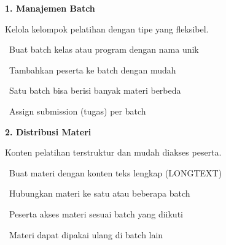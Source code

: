 \documentclass[a4paper]{article}
\begin{document}
\noindent
\begin{minipage}[t]{0.485\textwidth}
    \colorbox{VioletPrimary}{%
        \begin{minipage}{\dimexpr\textwidth-2\fboxsep\relax}
            {\fontsize{10}{13}\selectfont\bfseries\color{White} 1. Manajemen Batch}
        \end{minipage}}\par
    \vspace{4pt}
    {\fontsize{9}{12}\selectfont\color{TextDark}%
    Kelola kelompok pelatihan dengan tipe yang fleksibel.\par\vspace{3pt}
    \textbullet\ Buat batch kelas atau program dengan nama unik\par\vspace{2pt}%
    \textbullet\ Tambahkan peserta ke batch dengan mudah\par\vspace{2pt}%
    \textbullet\ Satu batch bisa berisi banyak materi berbeda\par\vspace{2pt}%
    \textbullet\ Assign submission (tugas) per batch}%
\end{minipage}%
\hfill
\begin{minipage}[t]{0.485\textwidth}
    \colorbox{BluePrimary}{%
        \begin{minipage}{\dimexpr\textwidth-2\fboxsep\relax}
            {\fontsize{10}{13}\selectfont\bfseries\color{White} 2. Distribusi Materi}
        \end{minipage}}\par
    \vspace{4pt}
    {\fontsize{9}{12}\selectfont\color{TextDark}%
    Konten pelatihan terstruktur dan mudah diakses peserta.\par\vspace{3pt}
    \textbullet\ Buat materi dengan konten teks lengkap (LONGTEXT)\par\vspace{2pt}%
    \textbullet\ Hubungkan materi ke satu atau beberapa batch\par\vspace{2pt}%
    \textbullet\ Peserta akses materi sesuai batch yang diikuti\par\vspace{2pt}%
    \textbullet\ Materi dapat dipakai ulang di batch lain}%
\end{minipage}
\end{document}
